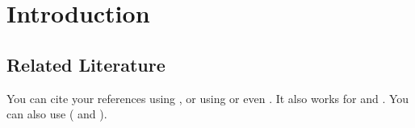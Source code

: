 \section{Introduction}

\subsection{Related Literature}

You can cite your references using \textcite{amihud2002illiquidity}, or using \parencite{amihud2002illiquidity} or even \cite{amihud2002illiquidity}. It also works for \textcite{eugene1992cross} and \textcite{novy2013other}. You can also use (\cite{amihud2002illiquidity} and \cite{novy2013other}).



















